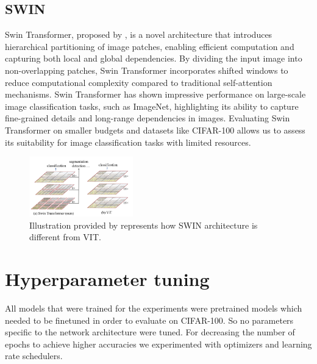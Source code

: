 \documentclass{article}
\begin{document}
\subsection{SWIN}
Swin Transformer, proposed by \cite{DBLP:journals/corr/abs-2103-14030}, is a novel architecture that introduces hierarchical partitioning of image patches, enabling efficient computation and capturing both local and global dependencies. By dividing the input image into non-overlapping patches, Swin Transformer incorporates shifted windows to reduce computational complexity compared to traditional self-attention mechanisms. Swin Transformer has shown impressive performance on large-scale image classification tasks, such as ImageNet, highlighting its ability to capture fine-grained details and long-range dependencies in images. Evaluating Swin Transformer on smaller budgets and datasets like CIFAR-100 allows us to assess its suitability for image classification tasks with limited resources.

\begin{figure}[ht]
    \vskip 0.2in
    \centering
    \includegraphics[width=0.4\textwidth]{swin.png}
    \caption{Illustration provided by \cite{DBLP:journals/corr/abs-2103-14030} represents how SWIN architecture is different from VIT.}
    \label{fig:foobar}
    \vskip -0.2in
\end{figure}

\section{Hyperparameter tuning}
All models that were trained for the experiments were pretrained models which needed to be finetuned in order to evaluate on CIFAR-100. So no parameters specific to the network architecture were tuned. For decreasing the number of epochs to achieve higher accuracies we experimented with optimizers and learning rate schedulers.
\end{document}
